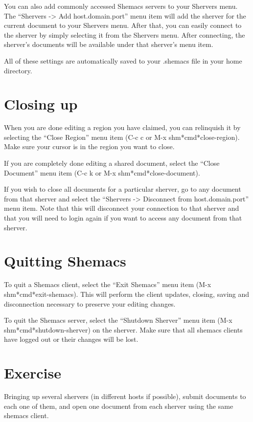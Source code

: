 You can also add commonly accessed Shemacs servers to your Shervers menu.
The ``Shervers -> Add host.domain.port'' menu item will add the sherver for
the current document to your Shervers menu.  After that, you can easily
connect to the sherver by simply selecting it from the Shervers menu.
After connecting, the sherver's documents will be available under that
sherver's menu item.

All of these settings are automatically saved to your .shemacs file in your 
home directory.

\section{Closing up}

When you are done editing a region you have claimed, you can relinquish it
by selecting the ``Close Region'' menu item (C-c c or M-x
shm*cmd*close-region).  Make sure your cursor is in the region you want to
close.

If you are completely done editing a shared document, select the ``Close 
Document'' menu item (C-c k or M-x shm*cmd*close-document).  

If you wish to close all documents for a particular sherver, go to any
document from that sherver and select the ``Shervers -> Disconnect from
host.domain.port'' menu item.  Note that this will disconnect your
connection to that sherver and that you will need to login again if you
want to access any document from that sherver.

\section{Quitting Shemacs}

To quit a Shemacs client, select the ``Exit Shemacs'' menu item (M-x
shm*cmd*exit-shemacs).  This will perform the client updates, closing,
saving and disconnection necessary to preserve your editing changes.

To quit the Shemacs server, select the ``Shutdown Sherver'' menu item 
(M-x shm*cmd*shutdown-sherver) on the sherver.  Make sure that all shemacs
clients have logged out or their changes will be lost.

\section{Exercise}

Bringing up several shervers (in different hosts if possible), submit 
documents to each one of them, and open one document from each sherver using 
the same shemacs client.





